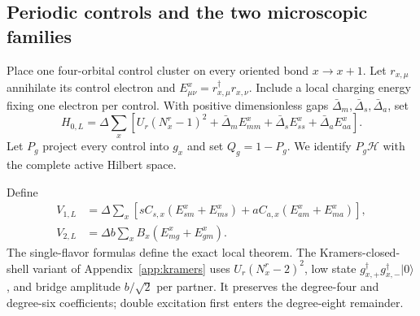 \documentclass[11pt]{article}
\theoremstyle{definition}
\theoremstyle{remark}
\newcommand{\cH}{\mathcal H}
\newcommand{\ket}[1]{\lvert #1\rangle}
\begin{document}
\subsection{Periodic controls and the two microscopic families}

Place one four-orbital control cluster on every oriented bond $x\to x+1$.  Let $r_{x,\mu}$ annihilate its control electron and $E^x_{\mu\nu}=r_{x,\mu}^\dagger r_{x,\nu}$.  Include a local charging energy fixing one electron per control.  With positive dimensionless gaps $\bar\Delta_m,\bar\Delta_s,\bar\Delta_a$, set
\begin{equation}
 H_{0,L}=\Delta\sum_x\left[U_r(N_x^r-1)^2+\bar\Delta_mE^x_{mm}+\bar\Delta_sE^x_{ss}+\bar\Delta_aE^x_{aa}\right].
 \label{eq:H0-global}
\end{equation}
Let $P_g$ project every control into $g_x$ and set $Q_g=1-P_g$.  We identify $P_g\cH$ with the complete active Hilbert space.

Define
\begin{align}
 V_{1,L}&=\Delta\sum_x[sC_{s,x}(E^x_{sm}+E^x_{ms})+aC_{a,x}(E^x_{am}+E^x_{ma})],
 \label{eq:V1}\\
 V_{2,L}&=\Delta b\sum_xB_x(E^x_{mg}+E^x_{gm}).
 \label{eq:V2}
\end{align}
The single-flavor formulas define the exact local theorem.  The Kramers-closed-shell variant of Appendix~\ref{app:kramers} uses $U_r(N_x^r-2)^2$, low state $g_{x,+}^\dagger g_{x,-}^\dagger\ket0$, and bridge amplitude $b/\sqrt2$ per partner.  It preserves the degree-four and degree-six coefficients; double excitation first enters the degree-eight remainder.
\end{document}
